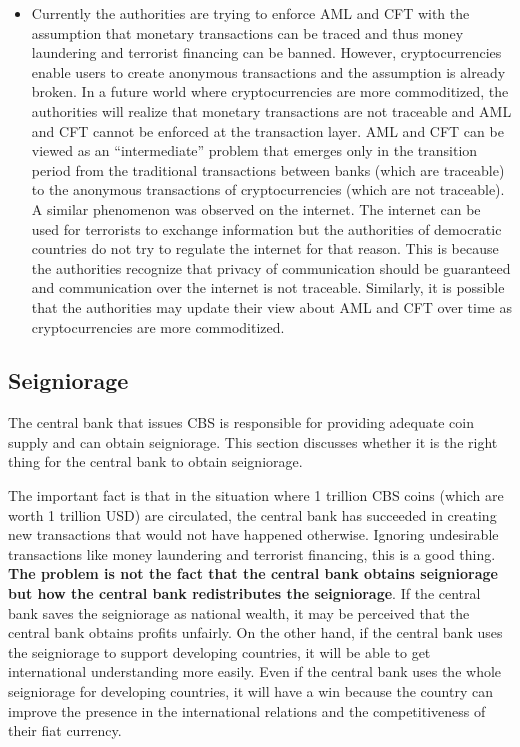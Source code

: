\documentclass[dvipdfmx,a4paper]{article}
\begin{document}
\begin{itemize}
\item Currently the authorities are trying to enforce AML and CFT with the assumption that monetary transactions can be traced and thus money laundering and terrorist financing can be banned. However, cryptocurrencies enable users to create anonymous transactions and the assumption is already broken. In a future world where cryptocurrencies are more commoditized, the authorities will realize that monetary transactions are not traceable and AML and CFT cannot be enforced at the transaction layer. AML and CFT can be viewed as an ``intermediate'' problem that emerges only in the transition period from the traditional transactions between banks (which are traceable) to the anonymous transactions of cryptocurrencies (which are not traceable). A similar phenomenon was observed on the internet. The internet can be used for terrorists to exchange information but the authorities of democratic countries  do not try to regulate the internet for that reason. This is because the authorities recognize that privacy of communication should be guaranteed and communication over the internet is not traceable. Similarly, it is possible that the authorities may update their view about AML and CFT over time as cryptocurrencies are more commoditized.
\end{itemize}

\subsection{Seigniorage}

The central bank that issues CBS is responsible for providing adequate coin supply and can obtain seigniorage. This section discusses whether it is the right thing for the central bank to obtain seigniorage.

The important fact is that in the situation where 1 trillion CBS coins (which are worth 1 trillion USD) are circulated, the central bank has succeeded in creating new transactions that would not have happened otherwise. Ignoring undesirable transactions like money laundering and terrorist financing, this is a good thing. \textbf{The problem is not the fact that the central bank obtains seigniorage but how the central bank redistributes the seigniorage}. If the central bank saves the seigniorage as national wealth, it may be perceived that the central bank obtains profits unfairly. On the other hand, if the central bank uses the seigniorage to support developing countries, it will be able to get international understanding more easily. Even if the central bank uses the whole seigniorage for developing countries, it will have a win because the country can improve the presence in the international relations and the competitiveness of their fiat currency.
\end{document}
